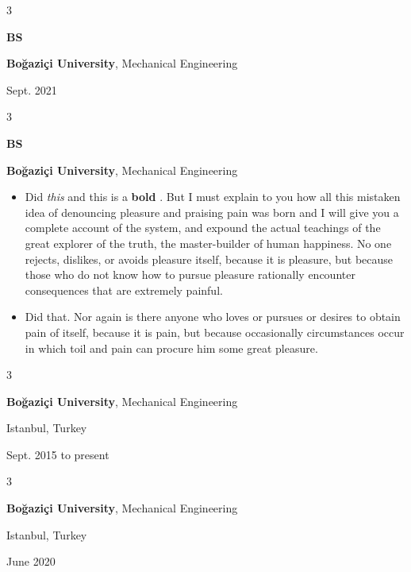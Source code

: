 \documentclass[10pt, letterpaper]{article}
\newenvironment{highlights}{
    \begin{itemize}[
        topsep=0.10 cm,
        parsep=0.10 cm,
        partopsep=0pt,
        itemsep=0pt,
        leftmargin=0.4 cm + 10pt
    ]
}{
    \end{itemize}
} %
\newenvironment{threecolentry}[3][]{
    \onecolentry
    \def\thirdColumn{#3}
    \setcolumnwidth{1 cm, \fill, 4.5 cm}
    \begin{paracol}{3}
    {\raggedright #2} \switchcolumn
}{
    \switchcolumn \raggedleft \thirdColumn
    \end{paracol}
    \endonecolentry
} %
\let\hrefWithoutArrow\href
\renewcommand{\href}[2]{\hrefWithoutArrow{#1}{\mbox{\ifthenelse{\equal{#2}{}}{ }{#2 }\raisebox{.15ex}{\footnotesize \faExternalLink*}}}}
\begin{document}
        \begin{threecolentry}{\textbf{BS}}{
            Sept. 2021
        }
            \textbf{Boğaziçi University}, Mechanical Engineering
        \end{threecolentry}

        \vspace{0.2 cm}

        \begin{threecolentry}{\textbf{BS}}{
            
        }
            \textbf{Boğaziçi University}, Mechanical Engineering
            \begin{highlights}
                \item Did \textit{this} and this is a \textbf{bold} \href{https://example.com}{link}. But I must explain to you how all this mistaken idea of denouncing pleasure and praising pain was born and I will give you a complete account of the system, and expound the actual teachings of the great explorer of the truth, the master-builder of human happiness. No one rejects, dislikes, or avoids pleasure itself, because it is pleasure, but because those who do not know how to pursue pleasure rationally encounter consequences that are extremely painful.
                \item Did that. Nor again is there anyone who loves or pursues or desires to obtain pain of itself, because it is pain, but because occasionally circumstances occur in which toil and pain can procure him some great pleasure.
            \end{highlights}
        \end{threecolentry}

        \vspace{0.2 cm}

        \begin{threecolentry}{\textbf{}}{
            Istanbul, Turkey

        Sept. 2015 to present
        }
            \textbf{Boğaziçi University}, Mechanical Engineering
        \end{threecolentry}

        \vspace{0.2 cm}

        \begin{threecolentry}{\textbf{}}{
            Istanbul, Turkey

        June 2020
        }
            \textbf{Boğaziçi University}, Mechanical Engineering
        \end{threecolentry}
\end{document}
